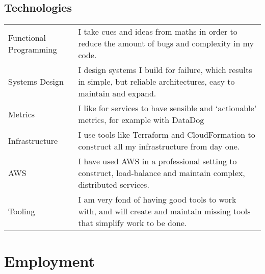 \documentclass[a4paper]{article}
\begin{document}
\subsection*{Technologies}
\begin{tabular}{ l p{11.7cm} }
 Functional Programming & I take cues and ideas from maths in order to reduce the
amount of bugs and complexity in my code.\\
Systems Design & I design systems I build for failure, which results in simple,
but reliable architectures, easy to maintain and expand.\\
Metrics & I like for services to have sensible and `actionable' metrics, for
example with DataDog \\
Infrastructure & I use tools like Terraform and CloudFormation to
construct all my infrastructure from day one. \\
AWS & I have used AWS in a professional setting to construct, load-balance and
maintain complex, distributed services. \\
Tooling & I am very fond of having good tools to work with, and will create and
maintain missing tools that simplify work to be done. \\
\end{tabular}

\section*{Employment}
\end{document}

